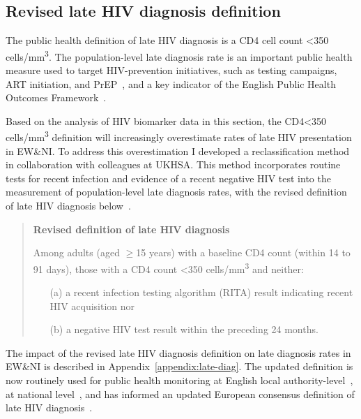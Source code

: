 \subsection{Revised late HIV diagnosis definition}\label{sec:ld-reassessment}

The public health definition of late HIV diagnosis is a CD4 cell count <350 cells/mm\textsuperscript{3}.  The population-level late diagnosis rate is an important public health measure used to target HIV-prevention initiatives, such as testing campaigns, ART initiation, and PrEP~\parencite{Brown2017-yu, Churchill2016-ol, NHS_England2019-gt}, and a key indicator of the English Public Health Outcomes Framework~\parencite{Office_for_Health_Improvement2023-xd}.

Based on the analysis of HIV biomarker data in this section, the CD4<350 cells/mm\textsuperscript{3} definition will increasingly overestimate rates of late HIV presentation in EW\&NI\@. To address this overestimation I developed a reclassification method in collaboration with colleagues at UKHSA\@. This method incorporates routine tests for recent infection and evidence of a recent negative HIV test into the measurement of population-level late diagnosis rates, with the revised definition of late HIV diagnosis below~\parencite{Kirwan2022-za}.

\begin{framed}
  \begin{quote}
    \textbf{Revised definition of late HIV diagnosis}

    Among adults (aged $\geq$15 years) with a baseline CD4 count (within  14 to 91 days), those with a CD4 count <350 cells/mm\textsuperscript{3} and neither:
    \begin{itemize}
      \item[(a)] a  recent  infection  testing  algorithm (RITA) result indicating recent HIV acquisition nor
      \item[(b)] a negative HIV test result within the preceding 24 months.
    \end{itemize}
  \end{quote}
\end{framed}

The impact of the revised late HIV diagnosis definition on late diagnosis rates in EW\&NI is described in Appendix~\ref{appendix:late-diag}. The updated definition is now routinely used for public health monitoring at English local authority-level~\parencite{Office_for_Health_Improvement2023-xd}, at national level~\parencite{Martin2023-um}, and has informed an updated European consensus definition of late HIV diagnosis~\parencite{Croxford2022-cv}.

